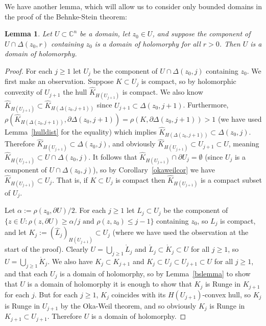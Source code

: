 \documentclass[11pt,a4paper, final, twoside]{article}
\newtheorem{lemma}[theorem]{Lemma}
\numberwithin{equation}{section}
\newcommand{\C}{\mathbb C}
\newcommand{\bd}{\partial}
\newcommand{\inter}[1]{\mathring{#1}}
\newcommand{\pdisc}{\Delta}
\newcommand{\pmetric}{\rho}
\newcommand{\hol}{H}
\begin{document}
We have another lemma, which will allow us to consider only bounded domains in the proof of the Behnke-Stein theorem:
\begin{lemma}
\label{berslemma}
Let $U\subset\C^n$ be a domain, let $z_0\in U$, and suppose the component of $U\cap\pdisc(z_0,r)$ containing $z_0$ is a domain of holomorphy for all $r>0$. Then $U$ is a domain of holomorphy. 
\end{lemma}
\begin{proof}
For each $j\geq 1$ let $U_j$ be the component of $U\cap\pdisc(z_0,j)$ containing $z_0$. We first make an observation. Suppose $K\subset U_j$ is compact, so by holomorphic convexity
of $U_{j+1}$ the hull $\hat K_{\hol(U_{j+1})}$ is compact. We also know
$\hat K_{\hol(U_{j+1})}\subset \hat K_{\hol(\pdisc(z_0,j+1))}$ since $U_{j+1}\subset\pdisc(z_0,j+1)$. Furthermore, 
$\pmetric(\hat K_{\hol(\pdisc(z_0,j+1))},\bd\pdisc(z_0,j+1))=\pmetric(K,\bd\pdisc(z_0,j+1))>1$ (we have used Lemma~\ref{hulldist} for the equality)
which implies $\hat K_{\hol(\pdisc(z_0,j+1))}\subset\pdisc(z_0,j)$. Therefore $\hat K_{\hol(U_{j+1})}\subset \pdisc(z_0,j)$, and obviously $\hat K_{\hol(U_{j+1})}\subset U_{j+1}\subset U$,
meaning $\hat K_{\hol(U_{j+1})}\subset U\cap\pdisc(z_0,j)$. It follows that $\hat K_{\hol(U_{j+1})}\cap \bd U_j=\emptyset$ (since $U_j$ is a component of $U\cap\pdisc(z_0,j)$), so by
Corollary~\ref{okaweilcor} we have $\hat K_{\hol(U_{j+1})}\subset U_j$. 
That is, if $K\subset U_j$ is compact then $\hat K_{\hol(U_{j+1})}$ is a compact subset of $U_j$.

Let $\alpha:=\pmetric(z_0,\bd U)/2$. 
For each $j\geq 1$ let $L_j\subset U_j$ 
be the component of $\{z\in U\colon \pmetric(z,\bd U)\geq \alpha/j\text{ and }\pmetric(z,z_0)\leq j-1\}$
containing $z_0$, so $L_j$ is compact, and let $K_j:=(\hat L_j)_{\hol(U_{j+1})}\subset U_j$ (where we have used the observation at the start of the proof).
Clearly $U=\bigcup_{j\geq 1}\inter L_j$ and $\inter L_j\subset \inter K_j\subset U$ for all $j\geq 1$, so $U=\bigcup_{j\geq 1}\inter K_j$. 
We also have $K_j\subset K_{j+1}$ and $K_j\subset U_j\subset U_{j+1}\subset U$ for all $j\geq 1$, and that each $U_j$ is a domain of holomorphy,
so by Lemma~\ref{bslemma} to show that $U$ is a domain of holomorphy it is enough to show that
$K_j$ is Runge in $K_{j+1}$ for each $j$. But for each $j\geq 1$, $K_j$ coincides with its $\hol(U_{j+1})$-convex hull, so $K_j$ is Runge in $U_{j+1}$ by the Oka-Weil theorem,
and so obviously $K_j$ is Runge in $K_{j+1}\subset U_{j+1}$.
Therefore $U$ is a domain of holomorphy.
\end{proof}
\end{document}
